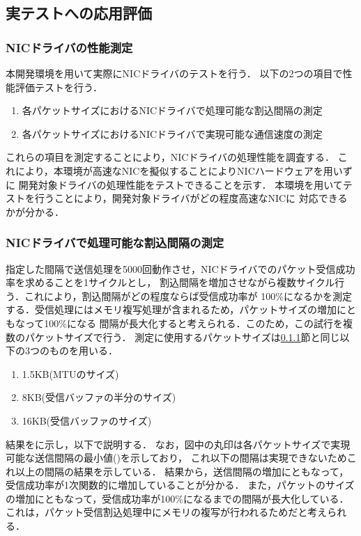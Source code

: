 \documentclass[submit,techreq,noauthor,dvipdfmx]{ipsj}
\begin{document}
\subsection{実テストへの応用評価}\label{sec:interval}

\subsubsection{NICドライバの性能測定}\label{sec:interval}

本開発環境を用いて実際にNICドライバのテストを行う．
以下の2つの項目で性能評価テストを行う．
\begin{enumerate}
    \item 各パケットサイズにおけるNICドライバで処理可能な割込間隔の測定
    \item 各パケットサイズにおけるNICドライバで実現可能な通信速度の測定
\end{enumerate}
これらの項目を測定することにより，NICドライバの処理性能を調査する．
これにより，本環境が高速なNICを擬似することによりNICハードウェアを用いずに
開発対象ドライバの処理性能をテストできることを示す．
本環境を用いてテストを行うことにより，開発対象ドライバがどの程度高速なNICに
対応できるかが分かる．

\subsubsection{NICドライバで処理可能な割込間隔の測定}\label{sec:mint-interval}
指定した間隔で送信処理を5000回動作させ，NICドライバでのパケット受信成功率を求めることを1サイクルとし，
割込間隔を増加させながら複数サイクル行う．これにより，割込間隔がどの程度ならば受信成功率が
100\%になるかを測定する．受信処理にはメモリ複写処理が含まれるため，パケットサイズの増加にともなって100\%になる
間隔が長大化すると考えられる．このため，この試行を複数のパケットサイズで行う．
測定に使用するパケットサイズは\ref{sec:interval}節と同じ以下の3つのものを用いる．
\begin{enumerate}
    \item 1.5KB(MTUのサイズ)
    \item 8KB(受信バッファの半分のサイズ)
    \item 16KB(受信バッファのサイズ)
\end{enumerate}

結果をに示し，以下で説明する．
なお，図中の丸印は各パケットサイズで実現可能な送信間隔の最小値()を示しており，
これ以下の間隔は実現できないためこれ以上の間隔の結果を示している．
結果から，送信間隔の増加にともなって，受信成功率が1次関数的に増加していることが分かる．
また，パケットのサイズの増加にともなって，受信成功率が100\%になるまでの間隔が長大化している．
これは，パケット受信割込処理中にメモリの複写が行われるためだと考えられる．
\end{document}
